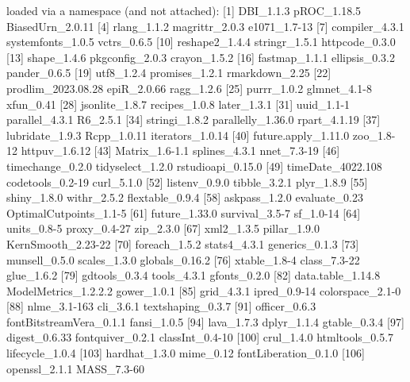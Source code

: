 \documentclass[10pt]{article}
\begin{document}
\begin{Schunk}
\begin{Soutput}
loaded via a namespace (and not attached):
  [1] DBI_1.1.3               pROC_1.18.5             BiasedUrn_2.0.11       
  [4] rlang_1.1.2             magrittr_2.0.3          e1071_1.7-13           
  [7] compiler_4.3.1          systemfonts_1.0.5       vctrs_0.6.5            
 [10] reshape2_1.4.4          stringr_1.5.1           httpcode_0.3.0         
 [13] shape_1.4.6             pkgconfig_2.0.3         crayon_1.5.2           
 [16] fastmap_1.1.1           ellipsis_0.3.2          pander_0.6.5           
 [19] utf8_1.2.4              promises_1.2.1          rmarkdown_2.25         
 [22] prodlim_2023.08.28      epiR_2.0.66             ragg_1.2.6             
 [25] purrr_1.0.2             glmnet_4.1-8            xfun_0.41              
 [28] jsonlite_1.8.7          recipes_1.0.8           later_1.3.1            
 [31] uuid_1.1-1              parallel_4.3.1          R6_2.5.1               
 [34] stringi_1.8.2           parallelly_1.36.0       rpart_4.1.19           
 [37] lubridate_1.9.3         Rcpp_1.0.11             iterators_1.0.14       
 [40] future.apply_1.11.0     zoo_1.8-12              httpuv_1.6.12          
 [43] Matrix_1.6-1.1          splines_4.3.1           nnet_7.3-19            
 [46] timechange_0.2.0        tidyselect_1.2.0        rstudioapi_0.15.0      
 [49] timeDate_4022.108       codetools_0.2-19        curl_5.1.0             
 [52] listenv_0.9.0           tibble_3.2.1            plyr_1.8.9             
 [55] shiny_1.8.0             withr_2.5.2             flextable_0.9.4        
 [58] askpass_1.2.0           evaluate_0.23           OptimalCutpoints_1.1-5 
 [61] future_1.33.0           survival_3.5-7          sf_1.0-14              
 [64] units_0.8-5             proxy_0.4-27            zip_2.3.0              
 [67] xml2_1.3.5              pillar_1.9.0            KernSmooth_2.23-22     
 [70] foreach_1.5.2           stats4_4.3.1            generics_0.1.3         
 [73] munsell_0.5.0           scales_1.3.0            globals_0.16.2         
 [76] xtable_1.8-4            class_7.3-22            glue_1.6.2             
 [79] gdtools_0.3.4           tools_4.3.1             gfonts_0.2.0           
 [82] data.table_1.14.8       ModelMetrics_1.2.2.2    gower_1.0.1            
 [85] grid_4.3.1              ipred_0.9-14            colorspace_2.1-0       
 [88] nlme_3.1-163            cli_3.6.1               textshaping_0.3.7      
 [91] officer_0.6.3           fontBitstreamVera_0.1.1 fansi_1.0.5            
 [94] lava_1.7.3              dplyr_1.1.4             gtable_0.3.4           
 [97] digest_0.6.33           fontquiver_0.2.1        classInt_0.4-10        
[100] crul_1.4.0              htmltools_0.5.7         lifecycle_1.0.4        
[103] hardhat_1.3.0           mime_0.12               fontLiberation_0.1.0   
[106] openssl_2.1.1           MASS_7.3-60            
\end{Soutput}
\end{Schunk}


\end{document}

